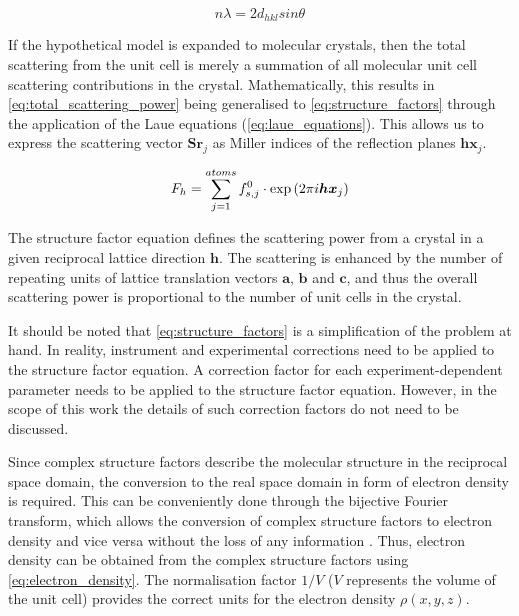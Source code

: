 \begin{equation}
    n\lambda=2d_{hkl}sin\theta
    \label{eq:bragg_equation}
\end{equation}

If the hypothetical model is expanded to molecular crystals, then the total scattering from the unit cell is merely a summation of all molecular unit cell scattering contributions in the crystal. Mathematically, this results in \cref{eq:total_scattering_power} being generalised to \cref{eq:structure_factors} through the application of the Laue equations (\cref{eq:laue_equations}). This allows us to express the scattering vector $\boldsymbol{S}\boldsymbol{r}_j$ as Miller indices of the reflection planes $\boldsymbol{h}\boldsymbol{x}_j$.

\begin{equation}
    F_h=\sum_{j=1}^{atoms}f_{s,j}^0 \cdot \exp\left(2\pi\\i\boldsymbol{h}\boldsymbol{x}_j\right)
    \label{eq:structure_factors}
\end{equation}

The structure factor equation defines the scattering power from a crystal in a given reciprocal lattice direction $\boldsymbol{h}$. The scattering is enhanced by the number of repeating units of lattice translation vectors $\boldsymbol{a}$, $\boldsymbol{b}$ and $\boldsymbol{c}$, and thus the overall scattering power is proportional to the number of unit cells in the crystal.

It should be noted that \cref{eq:structure_factors} is a simplification of the problem at hand. In reality, instrument and experimental corrections need to be applied to the structure factor equation. A correction factor for each experiment-dependent parameter needs to be applied to the structure factor equation. However, in the scope of this work the details of such correction factors do not need to be discussed.

Since complex structure factors describe the molecular structure in the reciprocal space domain, the conversion to the real space domain in form of electron density is required. This can be conveniently done through the bijective Fourier transform, which allows the conversion of complex structure factors to electron density and vice versa without the loss of any information \cite{Rupp2010-nc}. Thus, electron density can be obtained from the complex structure factors using \cref{eq:electron_density}. The normalisation factor $1/V$ ($V$ represents the volume of the unit cell) provides the correct units for the electron density $\rho(x,y,z)$.

